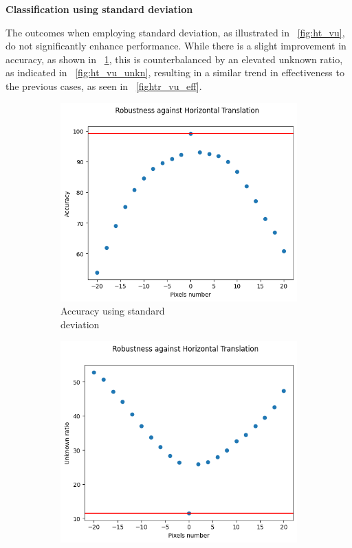 \vspace{0.3cm}
\textbf{Classification using standard deviation}
\vspace{0.1cm}

The outcomes when employing standard deviation, as illustrated in \Fig~\ref{fig:ht_vu}, do not significantly enhance performance. While there is a slight improvement in accuracy, as shown in \Fig~\ref{fig:ht_vu_acc}, this is counterbalanced by an elevated unknown ratio, as indicated in \Fig~\ref{fig:ht_vu_unkn}, resulting in a similar trend in effectiveness to the previous cases, as seen in \Fig~\ref{fightr_vu_eff}.

\begin{figure}[h]
	\centering
	\begin{subfigure}{.33\textwidth}
		\centering
		\includegraphics[width=0.9\linewidth]{ImageFiles/EvalBNN/HT/VU/acc}
		\caption{Accuracy using standard \\ deviation}
		\label{fig:ht_vu_acc}
	\end{subfigure}%
	\begin{subfigure}{.33\textwidth}
		\centering
		\includegraphics[width=0.9\linewidth]{ImageFiles/EvalBNN/HT/VU/unkn}

\end{subfigure}
\end{figure}
